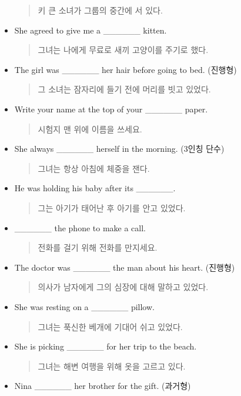 \documentclass{article}
\begin{document}
\begin{addmargin}[1em]{1em}
\begin{itemize}
\begin{quote}
    키 큰 소녀가 그룹의 중간에 서 있다.
    \end{quote}
    \item She agreed to give me a \_\_\_\_\_\_ kitten.
    \begin{quote}
    그녀는 나에게 무료로 새끼 고양이를 주기로 했다.
    \end{quote}
    \item The girl was \_\_\_\_\_\_ her hair before going to bed. (진행형)
    \begin{quote}
    그 소녀는 잠자리에 들기 전에 머리를 빗고 있었다.
    \end{quote}
    \item Write your name at the top of your \_\_\_\_\_\_ paper.
    \begin{quote}
    시험지 맨 위에 이름을 쓰세요.
    \end{quote}
    \item She always \_\_\_\_\_\_ herself in the morning. (3인칭 단수)
    \begin{quote}
    그녀는 항상 아침에 체중을 잰다.
    \end{quote}
    \item He was holding his baby after its \_\_\_\_\_\_.
    \begin{quote}
    그는 아기가 태어난 후 아기를 안고 있었다.
    \end{quote}
    \item \_\_\_\_\_\_ the phone to make a call.
    \begin{quote}
    전화를 걸기 위해 전화를 만지세요.
    \end{quote}
    \item The doctor was \_\_\_\_\_\_ the man about his heart. (진행형)
    \begin{quote}
    의사가 남자에게 그의 심장에 대해 말하고 있었다.
    \end{quote}
    \item She was resting on a \_\_\_\_\_\_ pillow.
    \begin{quote}
    그녀는 푹신한 베개에 기대어 쉬고 있었다.
    \end{quote}
    \item She is picking \_\_\_\_\_\_ for her trip to the beach.
    \begin{quote}
    그녀는 해변 여행을 위해 옷을 고르고 있다.
    \end{quote}
    \item Nina \_\_\_\_\_\_ her brother for the gift. (과거형)
    \begin{quote}

\end{quote}
\end{itemize}
\end{addmargin}
\end{document}
